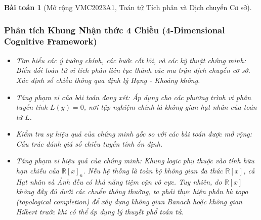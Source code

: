 \documentclass{article}
\newtheorem{baitoan}{Bài toán}
\begin{document}
\begin{baitoan}[Mở rộng VMC2023A1, Toán tử Tích phân và Dịch chuyển Cơ sở]
 \subsubsection*{Phân tích Khung Nhận thức 4 Chiều (4-Dimensional Cognitive Framework)}
 \begin{itemize}
 \item \textit{Tìm hiểu các ý tưởng chính, các bước cốt lõi, và các kỹ thuật chứng minh}: Biến đổi toán tử vi tích phân liên tục thành các ma trận dịch chuyển cơ sở. Xác định số chiều thông qua định lý Hạng - Khoảng không.
 \item \textit{Tăng phạm vi của bài toán đang xét}: Áp dụng cho các phương trình vi phân tuyến tính $L(y) = 0$, nơi tập nghiệm chính là không gian hạt nhân của toán tử $L$.
 \item \textit{Kiểm tra sự hiệu quả của chứng minh gốc so với các bài toán được mở rộng}: Cấu trúc đánh giá số chiều tuyến tính ổn định.
 \item \textit{Tăng phạm vi hiệu quả của chứng minh}: Khung logic phụ thuộc vào tính hữu hạn chiều của $\mathbb{R}[x]_n$. Nếu hệ thống là toàn bộ không gian đa thức $\mathbb{R}[x]$, cả Hạt nhân và Ảnh đều có khả năng tiệm cận vô cực. Tuy nhiên, do $\mathbb{R}[x]$ không đầy đủ dưới các chuẩn thông thường, ta phải thực hiện phần bù topo (topological completion) để xây dựng không gian Banach hoặc không gian Hilbert trước khi có thể áp dụng lý thuyết phổ toán tử.
 \end{itemize}
\end{baitoan}

\end{document}
